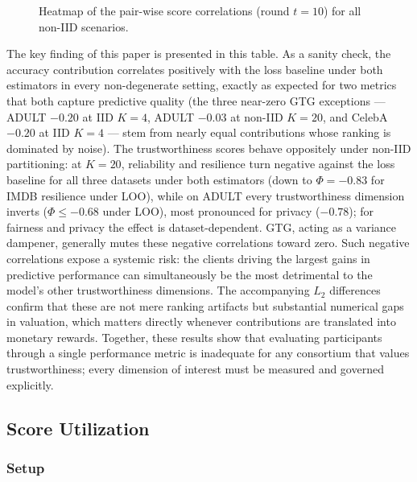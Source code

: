\documentclass[acmsmall]{acmart}
\begin{document}
\begin{figure}[!t]
    \caption{Heatmap of the pair-wise score correlations (round $t=10$) for all non-IID scenarios. }
    \label{fig:score_heat_NIID}
\end{figure}

The key finding of this paper is presented in this table. As a sanity check, the accuracy contribution correlates positively with the loss baseline under both estimators in every non-degenerate setting, exactly as expected for two metrics that both capture predictive quality (the three near-zero GTG exceptions --- ADULT $-0.20$ at IID $K{=}4$, ADULT $-0.03$ at non-IID $K{=}20$, and CelebA $-0.20$ at IID $K{=}4$ --- stem from nearly equal contributions whose ranking is dominated by noise). The trustworthiness scores behave oppositely under non-IID partitioning: at $K{=}20$, reliability and resilience turn negative against the loss baseline for all three datasets under both estimators (down to $\Phi=-0.83$ for IMDB resilience under LOO), while on ADULT every trustworthiness dimension inverts ($\Phi\le-0.68$ under LOO), most pronounced for privacy ($-0.78$); for fairness and privacy the effect is dataset-dependent. GTG, acting as a variance dampener, generally mutes these negative correlations toward zero. Such negative correlations expose a systemic risk: the clients driving the largest gains in predictive performance can simultaneously be the most detrimental to the model's other trustworthiness dimensions. The accompanying $L_2$ differences confirm that these are not mere ranking artifacts but substantial numerical gaps in valuation, which matters directly whenever contributions are translated into monetary rewards. Together, these results show that evaluating participants through a single performance metric is inadequate for any consortium that values trustworthiness; every dimension of interest must be measured and governed explicitly.

\subsection{Score Utilization}

\subsubsection*{Setup}
\end{document}

